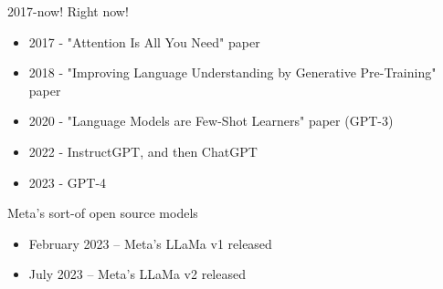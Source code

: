 \documentclass[handout]{beamer} %
\begin{document}

\begin{frame}{2017-now! Right now!}
	\begin{itemize}
		\item 2017 - "Attention Is All You Need" paper
		\pause
		\item 2018 - "Improving Language Understanding by Generative Pre-Training" paper
		\pause 
		\item 2020 - "Language Models are Few-Shot Learners" paper (GPT-3)
		\pause
		\item 2022 - InstructGPT, and then ChatGPT
		\pause
		\item 2023 - GPT-4
	\end{itemize}
\end{frame}

\begin{frame}[plain]
\end{frame}


\begin{frame}Meta's sort-of open source models
	\begin{itemize}
		\item February 2023 -- Meta's LLaMa v1 released
		\pause
		\item July 2023 -- Meta's LLaMa v2 released
	\end{itemize}
\end{frame}
\end{document}
